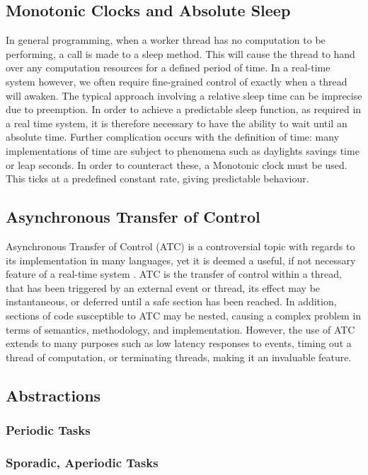 \subsection{Monotonic Clocks and Absolute Sleep}
In general programming, when a worker thread has no computation to be 
performing, a call is made to a sleep method. This will cause the thread
to hand over any computation resources for a defined period of time. In a 
real-time system however, we often require fine-grained control of exactly
when a thread will awaken. The typical approach involving a relative sleep 
time can be imprecise due to preemption. In order to achieve a predictable 
sleep function, as required in a real time system, it is therefore necessary 
to have the ability to wait until an absolute time. Further complication 
occurs with the definition of time: many implementations of time are subject 
to phenomena such as daylights savings time or leap seconds. 
In order to counteract these, a Monotonic clock must be used. This ticks at a 
predefined constant rate, giving predictable behaviour. 

\subsection{Asynchronous Transfer of Control}
Asynchronous Transfer of Control (ATC) is a controversial topic with regards to its 
implementation in many languages, yet it is deemed a useful, if not necessary 
feature of a real-time system 
\cite{atc-article}. ATC is the transfer 
of control within a thread, that has been triggered by an external event or thread, 
its effect may be instantaneous, or deferred until a safe section has been reached. 
In addition, sections of code susceptible to ATC may be nested, causing a 
complex problem in terms of semantics, methodology, and implementation. 
However, the use of ATC extends to many purposes such as low latency responses to events, timing 
out a thread of computation, or terminating threads, making it an invaluable feature. 

\subsection{Abstractions}
\subsubsection{Periodic Tasks}
\subsubsection{Sporadic, Aperiodic Tasks}
